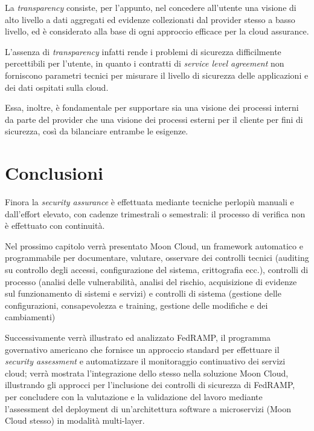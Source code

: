 \documentclass[../main.tex]{subfiles}
\begin{document}
La \textit{transparency} consiste, per l'appunto, nel concedere all'utente una visione di alto livello a dati aggregati ed evidenze collezionati dal provider stesso a basso livello, ed è considerato alla base di ogni approccio efficace per la cloud assurance\cite{6814039}\cite{6375614}.


L'assenza di \textit{transparency} infatti rende i problemi di sicurezza difficilmente percettibili per l'utente\cite{Ardagna:2015:SAC:2808687.2767005}, in quanto i contratti di \textit{service level agreement} non forniscono parametri tecnici per misurare il livello di sicurezza delle applicazioni e dei dati ospitati sulla cloud\cite{6684427}.

Essa, inoltre, è fondamentale per supportare sia una visione dei processi interni da parte del provider che una visione dei processi esterni per il cliente per fini di sicurezza, così da bilanciare entrambe le esigenze\cite{Ardagna:2015:SAC:2808687.2767005}.

\section{Conclusioni}

Finora la \textit{security assurance} è effettuata mediante tecniche perlopiù manuali e dall'effort elevato, con cadenze trimestrali o semestrali: il processo di verifica non è effettuato con continuità.

Nel prossimo capitolo verrà presentato Moon Cloud, un framework automatico e programmabile per documentare, valutare, osservare dei controlli tecnici (auditing su controllo degli accessi, configurazione del sistema, crittografia ecc.), controlli di processo (analisi delle vulnerabilità, analisi del rischio, acquisizione di evidenze sul funzionamento di sistemi e servizi) e controlli di sistema (gestione delle configurazioni, consapevolezza e training, gestione delle modifiche e dei cambiamenti)


Successivamente verrà illustrato ed analizzato FedRAMP, il programma governativo americano che fornisce un approccio standard per effettuare il \textit{security assessment} e automatizzare il monitoraggio continuativo dei servizi cloud; verrà mostrata l'integrazione dello stesso nella soluzione Moon Cloud, illustrando gli approcci per l'inclusione dei controlli di sicurezza di FedRAMP, per concludere con la valutazione e la validazione del lavoro mediante l'assessment del deployment di un'architettura software a microservizi (Moon Cloud stesso) in modalità multi-layer.
\end{document}
